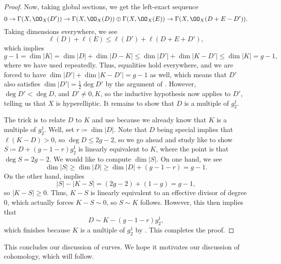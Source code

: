 \documentclass[../notes.tex]{subfiles}
\begin{document}
\begin{proof}
	Now, taking global sections, we get the left-exact sequence
	\[0\to\Gamma(X,\OO_X(D'))\to\Gamma(X,\OO_X(D))\oplus\Gamma(X,\OO_X(E))\to\Gamma(X,\OO_X(D+E-D')).\]
	Taking dimensions everywhere, we see
	\[\ell(D)+\ell(E)\le\ell(D')+\ell(D+E+D'),\]
	which implies
	\[g-1=\dim|K|=\dim|D|+\dim|D-K|\le\dim|D'|+\dim|K-D'|\le\dim|K|=g-1,\]
	where we have used  repeatedly. Thus, equalities hold everywhere, and we are forced to have $\dim|D'|+\dim|K-D'|=g-1$ as well, which means that $D'$ also satisfies $\dim|D'|=\frac12\deg D'$ by the argument of . However, $\deg D'<\deg D$, and $D'\ne0,K$, so the inductive hypothesis now applies to $D'$, telling us that $X$ is hyperelliptic. It remains to show that $D$ is a multiple of $g^1_2$.

	The trick is to relate $D$ to $K$ and use  because we already know that $K$ is a multiple of $g^1_2$. Well, set $r\coloneqq\dim|D|$. Note that $D$ being special implies that $\ell(K-D)>0$, so $\deg D\le2g-2$, so we go ahead and study like to show $S\coloneqq D+(g-1-r)g^1_2$ is linearly equivalent to $K$, where the point is that $\deg S=2g-2$. We would like to compute $\dim|S|$. On one hand, we see
	\[\dim|S|\ge\dim|D|\ge\dim|D|+(g-1-r)=g-1.\]
	On the other hand,  implies
	\[|S|-|K-S|=(2g-2)+(1-g)=g-1,\]
	so $|K-S|\ge0$. Thus, $K-S$ is linearly equivalent to an effective divisor of degree $0$, which actually forces $K-S\sim0$, so $S\sim K$ follows. However, this then implies that
	\[D\sim K-(g-1-r)g^1_2,\]
	which finishes because $K$ is a multiple of $g^1_2$ by . This completes the proof.
\end{proof}
\begin{remark}
	This concludes our discussion of curves. We hope it motivates our discussion of cohomology, which will follow.
\end{remark}
\end{document}

